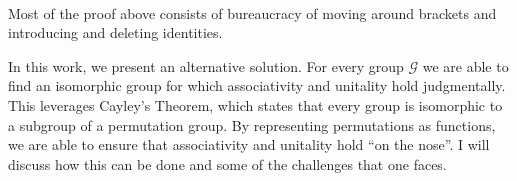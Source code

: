 \documentclass{article}
\begin{document}
\begin{code}
\AgdaSymbol{)}\AgdaSpace{}%
\AgdaSymbol{(}\AgdaSpace{}%
\AgdaSymbol{(}\AgdaSpace{}%
\AgdaSymbol{))}\AgdaSpace{}%
\<%
\\
%
\>[2]\AgdaSpace{}%
\AgdaSpace{}%
\AgdaSymbol{(}\AgdaSpace{}%
\AgdaSpace{}%
\AgdaSpace{}%
\AgdaSymbol{)}%
\>[19]\AgdaSpace{}%
\AgdaSpace{}%
\AgdaSpace{}%
\AgdaSpace{}%
\AgdaSymbol{(}\AgdaSpace{}%
\AgdaSymbol{)}\AgdaSpace{}%
\<%
\\
%
\>[2]\AgdaSymbol{(}\AgdaSpace{}%
\AgdaSpace{}%
\AgdaSymbol{)}\AgdaSpace{}%
\AgdaSpace{}%
\AgdaSpace{}%
%
\>[19]\AgdaSpace{}%
\AgdaSpace{}%
\AgdaSymbol{(}\AgdaSpace{}%
\AgdaSpace{}%
\AgdaSymbol{)}\AgdaSpace{}%
\AgdaSpace{}%
\<%
\\
%
\>[2]\AgdaSpace{}%
\AgdaSpace{}%
\AgdaSpace{}%
%
\>[19]\AgdaSpace{}%
\AgdaSpace{}%
\AgdaSymbol{(}\AgdaSpace{}%
\AgdaSymbol{)}\AgdaSpace{}%
\<%
\\
%
\>[2]\AgdaSpace{}%
\AgdaSpace{}%
\<%
\\
%
\>[2]\<%
\\
\>[2][@{}l@{\AgdaIndent{0}}]%
\>[4]\AgdaSpace{}%
\AgdaSpace{}%
\AgdaSymbol{(}\AgdaSpace{}%
\AgdaSymbol{)}\<%
\end{code}

Most of the proof above consists of bureaucracy of moving around brackets and introducing and deleting identities.

In this work, we present an alternative solution. For every group \(\mathcal{G}\) we are able to find an isomorphic group for which associativity and unitality hold judgmentally. This leverages Cayley's Theorem, which states that every group is isomorphic to a subgroup of a permutation group. By representing permutations as functions, we are able to ensure that associativity and unitality hold ``on the nose''. I will discuss how this can be done and some of the challenges that one faces.
\end{document}
